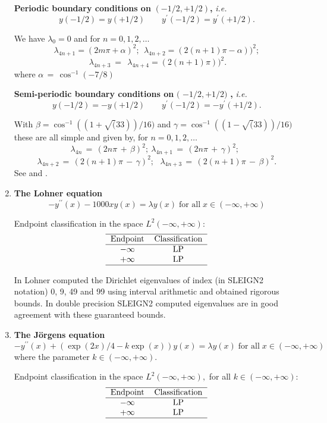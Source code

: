 \documentclass[12pt]{amsart}%
\theoremstyle{plain}
\numberwithin{equation}{section}
\begin{document}
\begin{enumerate}
\textbf{Periodic boundary conditions on} $(-1/2,+1/2)$\textbf{, }\textit{i.e.}%
\[
y(-1/2)=y(+1/2)\quad\quad y^{\prime}(-1/2)=y^{\prime}(+1/2).
\]

We have $\lambda_{0}=0$ and for $n=0,1,2,\ldots$
\[
\lambda_{4n+1}=(2m\pi+\alpha)^{2};\ \ \lambda_{4n+2}=(2(n+1)\pi-\alpha))^{2};
\]%
\[
\ \lambda_{4n+3}\ =\ \ \lambda_{4n+4}=(2(n+1)\pi))^{2}.
\]
where $\alpha\,=\,\cos^{-1}(-7/8)$

\textbf{Semi-periodic boundary conditions on }$($\textbf{ }$-1/2,+1/2)$%
\textbf{, }\textit{i.e.}%
\[
y(-1/2)=-y(+1/2)\quad\quad y^{\prime}(-1/2)=-y^{\prime}(+1/2).
\]

With $\beta=\cos^{-1}((1+\sqrt{(}33))/16)$ and $\gamma=\cos^{-1}((1-\sqrt
{(}33))/16)$ these are all simple and given by, for $n=0,1,2,\ldots$
\[
\lambda_{4n}\,=\,(2n\pi\,+\,\beta)^{2};\ \lambda_{4n+1}\,=\,(2n\pi
\,+\,\gamma)^{2};\ \
\]%
\[
\lambda_{4n+2}\,=\,(2(n+1)\pi\,-\,\gamma)^{2};\text{ }\lambda_{4n+3}%
\,=\,(2(n+1)\pi\,-\,\beta)^{2}.
\]
See \cite{E} and \cite{Hoc}.

\item \textbf{The Lohner equation}%
\[
-y^{\prime\prime}(x)-1000xy(x)=\lambda y(x)\;\text{for all}\;x\in
(-\infty,+\infty)
\]

Endpoint classification in the space $L^{2}(-\infty,+\infty)$:%
\[%
\begin{tabular}
[c]{cc}\hline
Endpoint & Classification\\\hline
$-\infty$ & LP\\
$+\infty$ & LP\\\hline
\end{tabular}
\]

In \cite{L} Lohner computed the Dirichlet eigenvalues of index (in SLEIGN2
notation) 0, 9, 49 and 99 using interval arithmetic and obtained rigorous
bounds. In double precision SLEIGN2 computed eigenvalues are in good agreement
with these guaranteed bounds.

\item \textbf{The J\"{o}rgens equation}%
\[
-y^{\prime\prime}(x)+(\exp(2x)/4-k\exp(x))y(x)=\lambda y(x)\;\text{for
all}\;x\in(-\infty,+\infty)
\]
where the parameter $k\in(-\infty,+\infty).$

Endpoint classification in the space $L^{2}(-\infty,+\infty),$ for all
$k\in(-\infty,+\infty)$:%
\[%
\begin{tabular}
[c]{cc}\hline
Endpoint & Classification\\\hline
$-\infty$ & LP\\
$+\infty$ & LP\\\hline
\end{tabular}
\]


\end{enumerate}
\end{document}
